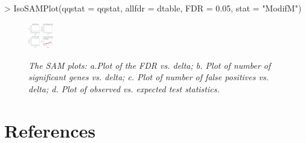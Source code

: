 \documentclass[10pt]{article}
\begin{document}
\begin{Schunk}
\begin{Sinput}
> IsoSAMPlot(qqstat = qqstat, allfdr = dtable, FDR = 0.05, stat = "ModifM")
\end{Sinput}
\end{Schunk}

 
  

\newpage
\clearpage

\begin{figure}[!h]
\centering
{\includegraphics[width=0.1\textwidth]{IsoGene-IsoSAMPlotOutput.pdf}}
\caption{\em {The SAM plots: a.Plot of the FDR vs. delta; b. Plot of number of significant genes vs. delta; c. Plot of
number of false positives vs. delta; d. Plot of observed vs. expected test statistics.}} \label{IsoBHPlot}
\end{figure}



\clearpage
\newpage


\section*{References}
\end{document}
